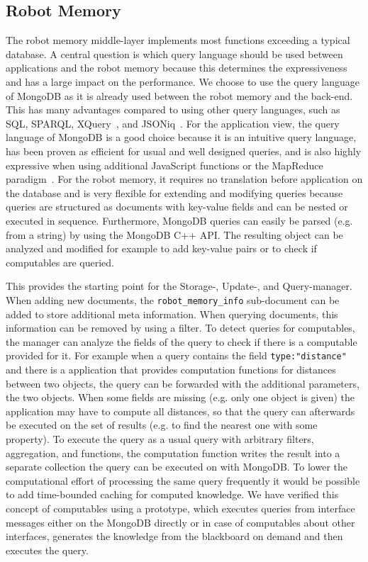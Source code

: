 \subsection{Robot Memory}
\label{sec:impl-memory}
The robot memory middle-layer implements most functions exceeding a
typical database.
A central question is which query language should be used between
applications and the robot memory because this determines the
expressiveness and has a large impact on the performance. We choose to
use the query language of MongoDB as it is already used between the
robot memory and the back-end. This has many advantages compared to
using other query languages, such as SQL, SPARQL,
XQuery~\cite{query-languages}, and JSONiq~\cite{jsoniq}.
%
For the application view, the query language of MongoDB is a good
choice because it is an intuitive query language, has been proven as
efficient for usual and well designed queries, and is also highly
expressive when using additional JavaScript functions or the MapReduce
paradigm~\cite{mongodb,RoboDB}. For the robot memory, it requires no
translation before application on the database and is very flexible
for extending and modifying queries because queries are structured as
documents with key-value fields and can be nested or executed in
sequence. Furthermore, MongoDB queries can easily be parsed (e.g. from
a string) by using the MongoDB C++ API. The resulting object can be
analyzed and modified for example to add key-value pairs or to check
if computables are queried.

This provides the starting point for the Storage-, Update-, and
Query-manager. When adding new documents, the
\texttt{robot\_memory\_info} sub-document can be added to store
additional meta information. When querying documents, this information
can be removed by using a filter. To detect queries for computables,
the manager can analyze the fields of the query to check if there is a
computable provided for it.  For example when a query contains the
field \texttt{type:"distance"} and there is a application that
provides computation functions for distances between two objects, the
query can be forwarded with the additional parameters, the two
objects.  When some fields are missing (e.g. only one object is given)
the application may have to compute all distances, so that the query
can afterwards be executed on the set of results (e.g. to find the
nearest one with some property). To execute the query as a usual query
with arbitrary filters, aggregation, and functions, the computation
function writes the result into a separate collection the query
can be executed on with MongoDB. To lower the computational effort of
processing the same query frequently it would be possible to add
time-bounded caching for computed knowledge. We have verified this
concept of computables using a prototype, which executes queries from
interface messages either on the MongoDB directly or in case of
computables about other interfaces, generates the knowledge from the
blackboard on demand and then executes the query.

